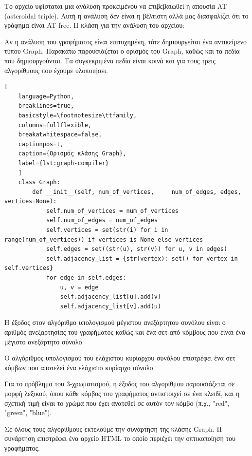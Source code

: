 Το αρχείο υφίσταται μια ανάλυση προκειμένου να επιβεβαιωθεί η απουσία AT (asteroidal triple). Αυτή η ανάλυση δεν είναι η βέλτιστη αλλά μας διασφαλίζει ότι το γράφημα είναι AT-free. Η κλάση για την ανάλυση του αρχείου:


\captionsetup[lstlisting]{labelformat = empty}





Αν η ανάλυση του γραφήματος είναι επιτυχημένη, τότε δημιουργείται ένα αντικείμενο τύπου Graph. Παρακάτω παρουσιάζεται ο ορισμός του Graph, καθώς και τα πεδία που δημιουργούνται. Τα συγκεκριμένα πεδία είναι κοινά και για τους τρεις αλγορίθμους που έχουμε υλοποιήσει. 

  

\begin{lstlisting}[
	language=Python,
	breaklines=true,
	basicstyle=\footnotesize\ttfamily,
	columns=fullflexible,
	breakatwhitespace=false,
	captionpos=t,
	caption={Ορισμός κλάσης Graph},
	label={lst:graph-compiler}
	]
	class Graph:
		def __init__(self, num_of_vertices, 	num_of_edges, edges, vertices=None):
			self.num_of_vertices = num_of_vertices
			self.num_of_edges = num_of_edges
			self.vertices = set(str(i) for i in range(num_of_vertices)) if vertices is None else vertices
			self.edges = set((str(u), str(v)) for u, v in edges)
			self.adjacency_list = {str(vertex): set() for vertex in self.vertices}
			for edge in self.edges:
				u, v = edge
				self.adjacency_list[u].add(v)
				self.adjacency_list[v].add(u)
\end{lstlisting}


Η έξοδος στον αλγόριθμο υπολογισμού μέγιστου ανεξάρτητου συνόλου
είναι ο αριθμός ανεξαρτησίας του γραφήματος καθώς και ένα σετ από κόμβους που είναι ένα μέγιστο ανεξάρτητο σύνολο. 


Ο αλγόριθμος υπολογισμού του ελάχιστου κυρίαρχου συνόλου επιστρέφει ένα σετ κόμβων που αποτελεί ένα ελάχιστο κυρίαρχο σύνολο.  

Για το πρόβλημα του 3-χρωματισμού, η έξοδος του αλγορίθμου παρουσιάζεται σε μορφή λεξικού, όπου κάθε κόμβος του γραφήματος αντιστοιχεί σε ένα κλειδί, και η σχετική τιμή είναι το χρώμα που έχει ανατεθεί σε αυτόν τον κόμβο (π.χ., "red", "green", "blue").

Σε όλους τους αλγορίθμους εκτελούμε την συνάρτηση  της κλάσης Graph. Η συνάρτηση επιστρέφει ένα αρχείο HTML το οποίο περιέχει την οπτικοποίηση του γραφήματος.

